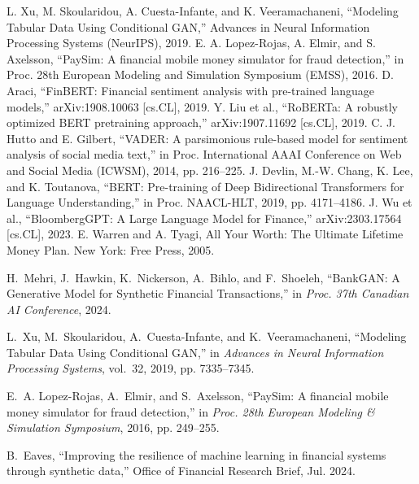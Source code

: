 \documentclass[conference]{IEEEtran}
\begin{document}
\begin{thebibliography}{00}
 L. Xu, M. Skoularidou, A. Cuesta-Infante, and K. Veeramachaneni, \textquotedblleft Modeling Tabular Data Using Conditional GAN,\textquotedblright{} Advances in Neural Information Processing Systems (NeurIPS), 2019.
 E. A. Lopez-Rojas, A. Elmir, and S. Axelsson, \textquotedblleft PaySim: A financial mobile money simulator for fraud detection,\textquotedblright{} in Proc. 28th European Modeling and Simulation Symposium (EMSS), 2016.
 D. Araci, \textquotedblleft FinBERT: Financial sentiment analysis with pre-trained language models,\textquotedblright{} arXiv:1908.10063 [cs.CL], 2019.
 Y. Liu et al., \textquotedblleft RoBERTa: A robustly optimized BERT pretraining approach,\textquotedblright{} arXiv:1907.11692 [cs.CL], 2019.
 C. J. Hutto and E. Gilbert, \textquotedblleft VADER: A parsimonious rule-based model for sentiment analysis of social media text,\textquotedblright{} in Proc. International AAAI Conference on Web and Social Media (ICWSM), 2014, pp. 216--225.
 J. Devlin, M.-W. Chang, K. Lee, and K. Toutanova, \textquotedblleft BERT: Pre-training of Deep Bidirectional Transformers for Language Understanding,\textquotedblright{} in Proc. NAACL-HLT, 2019, pp. 4171--4186.
 J. Wu et al., \textquotedblleft BloombergGPT: A Large Language Model for Finance,\textquotedblright{} arXiv:2303.17564 [cs.CL], 2023.
 E. Warren and A. Tyagi, All Your Worth: The Ultimate Lifetime Money Plan. New York: Free Press, 2005.


H.~Mehri, J.~Hawkin, K.~Nickerson, A.~Bihlo, and F.~Shoeleh, ``BankGAN: A Generative Model for Synthetic Financial Transactions,'' in \emph{Proc. 37th Canadian AI Conference}, 2024.

L.~Xu, M.~Skoularidou, A.~Cuesta-Infante, and K.~Veeramachaneni, ``Modeling Tabular Data Using Conditional GAN,'' in \emph{Advances in Neural Information Processing Systems}, vol.~32, 2019, pp. 7335--7345.

E.~A. Lopez-Rojas, A.~Elmir, and S.~Axelsson, ``PaySim: A financial mobile money simulator for fraud detection,'' in \emph{Proc. 28th European Modeling \& Simulation Symposium}, 2016, pp. 249--255.

B.~Eaves, ``Improving the resilience of machine learning in financial systems through synthetic data,'' Office of Financial Research Brief, Jul. 2024.


\end{thebibliography}
\end{document}
